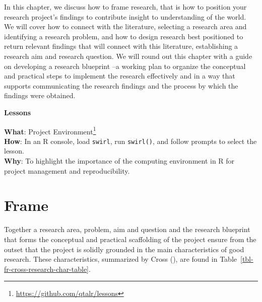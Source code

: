 \documentclass[
  letterpaper,
]{latex/krantz}
\theoremstyle{definition}
\theoremstyle{remark}
\DeclareRobustCommand{\href}[2]{#2\footnote{\url{#1}}}
\begin{document}
In this chapter, we discuss how to frame research, that is how to
position your research project's findings to contribute insight to
understanding of the world. We will cover how to connect with the
literature, selecting a research area and identifying a research
problem, and how to design research best positioned to return relevant
findings that will connect with this literature, establishing a research
aim and research question. We will round out this chapter with a guide
on developing a research blueprint --a working plan to organize the
conceptual and practical steps to implement the research effectively and
in a way that supports communicating the research findings and the
process by which the findings were obtained.

\begin{tcolorbox}[enhanced jigsaw, colback=white, colframe=quarto-callout-color-frame, leftrule=.75mm, opacityback=0, rightrule=.15mm, bottomrule=.15mm, toprule=.15mm, breakable, left=2mm, arc=.35mm]

\textbf{ Lessons}

\textbf{What}: \href{https://github.com/qtalr/lessons}{Project
Environment}\\
\textbf{How}: In an R console, load \texttt{swirl}, run
\texttt{swirl()}, and follow prompts to select the lesson.\\
\textbf{Why}: To highlight the importance of the computing environment
in R for project management and reproducibility.

\end{tcolorbox}

\section{Frame}\label{sec-fr-frame}

Together a research area, problem, aim and question and the research
blueprint that forms the conceptual and practical scaffolding of the
project ensure from the outset that the project is solidly grounded in
the main characteristics of good research. These characteristics,
summarized by Cross (), are found in
Table~\ref{tbl-fr-cross-research-char-table}.
\end{document}
